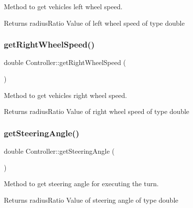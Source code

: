 Method to get vehicle\textquotesingle{}s left wheel speed. 

\begin{DoxyReturn}{Returns}
radius\+Ratio Value of left wheel speed of type double 
\end{DoxyReturn}
\mbox{\label{classController_ad50ec21787d1ac38c6ad8c8086384b22}} 
\subsubsection{\texorpdfstring{get\+Right\+Wheel\+Speed()}{getRightWheelSpeed()}}
{\footnotesize\ttfamily double Controller\+::get\+Right\+Wheel\+Speed (\begin{DoxyParamCaption}{ }\end{DoxyParamCaption})}



Method to get vehicle\textquotesingle{}s right wheel speed. 

\begin{DoxyReturn}{Returns}
radius\+Ratio Value of right wheel speed of type double 
\end{DoxyReturn}
\mbox{\label{classController_a63b99bb3559bd410951915a4795b154c}} 
\subsubsection{\texorpdfstring{get\+Steering\+Angle()}{getSteeringAngle()}}
{\footnotesize\ttfamily double Controller\+::get\+Steering\+Angle (\begin{DoxyParamCaption}{ }\end{DoxyParamCaption})}



Method to get steering angle for executing the turn. 

\begin{DoxyReturn}{Returns}
radius\+Ratio Value of steering angle of type double 
\end{DoxyReturn}
\mbox{\label{classController_a30079abc08acf260716cf663070249ac}} 
